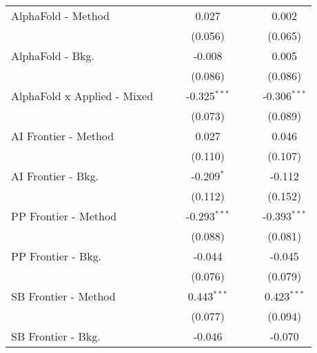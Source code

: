\begin{tabular}{lcccccc}
   AlphaFold - Method             &         &              & 0.027          &              &             & 0.002\\   
                                  &         &              & (0.056)        &              &             & (0.065)\\   
   AlphaFold - Bkg.               &         &              & -0.008         &              &             & 0.005\\   
                                  &         &              & (0.086)        &              &             & (0.086)\\   
   AlphaFold x Applied - Mixed    &         &              & -0.325$^{***}$ &              &             & -0.306$^{***}$\\   
                                  &         &              & (0.073)        &              &             & (0.089)\\   
   AI Frontier - Method           &         &              & 0.027          &              &             & 0.046\\   
                                  &         &              & (0.110)        &              &             & (0.107)\\   
   AI Frontier - Bkg.             &         &              & -0.209$^{*}$   &              &             & -0.112\\   
                                  &         &              & (0.112)        &              &             & (0.152)\\   
   PP Frontier - Method           &         &              & -0.293$^{***}$ &              &             & -0.393$^{***}$\\   
                                  &         &              & (0.088)        &              &             & (0.081)\\   
   PP Frontier - Bkg.             &         &              & -0.044         &              &             & -0.045\\   
                                  &         &              & (0.076)        &              &             & (0.079)\\   
   SB Frontier - Method           &         &              & 0.443$^{***}$  &              &             & 0.423$^{***}$\\   
                                  &         &              & (0.077)        &              &             & (0.094)\\   
   SB Frontier - Bkg.             &         &              & -0.046         &              &             & -0.070\\   

\end{tabular}
